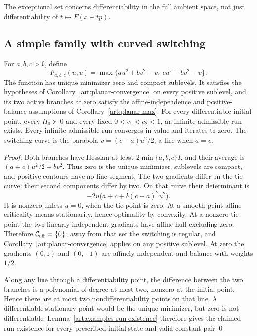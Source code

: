 The exceptional set concerns differentiability in the full ambient space,
not just differentiability of $t\mapsto F(x+tp)$.

\subsection{A simple family with curved switching}

\begin{proposition}\label{art:examples-two-quadratics}
For $a,b,c>0$, define
\[
 F_{a,b,c}(u,v)=\max\{a u^2+b v^2+v,\ c u^2+b v^2-v\}.
\]
The function has unique minimizer zero and compact sublevels. It satisfies
the hypotheses of Corollary~\ref{art:planar-convergence} on every positive
sublevel, and its two active branches at zero satisfy the affine-independence
and positive-balance assumptions of Corollary~\ref{art:planar-max}.
For every differentiable initial point, every $H_0\succ0$ and every fixed
$0<c_1<c_2<1$, an infinite admissible run exists. Every infinite admissible
run converges in value and iterates to zero. The switching curve is the
parabola $v=(c-a)u^2/2$, a line when $a=c$.
\end{proposition}
\begin{proof}
Both branches have Hessian at least $2\min\{a,b,c\}I$, and their average
is $(a+c)u^2/2+bv^2$. Thus zero is the unique minimizer, sublevels are compact,
and positive contours have no line segment. The two gradients differ on
the tie curve: their second components differ by two. On that curve their
determinant is
\[
 -2u\bigl(a+c+b(c-a)^2u^2\bigr).
\]
It is nonzero unless $u=0$, when the tie point is zero. At a smooth point
affine criticality means stationarity, hence optimality by convexity.
At a nonzero tie point the two linearly independent gradients have affine
hull excluding zero. Therefore $\mathcal C_{\rm aff}=\{0\}$; away from
that set the switching is regular, and Corollary~\ref{art:planar-convergence}
applies on any positive sublevel. At zero the gradients $(0,1)$ and $(0,-1)$
are affinely independent and balance with weights $1/2$.

Along any line through a differentiability point, the difference between
the two branches is a polynomial of degree at most two, nonzero at the
initial point. Hence there are at most two nondifferentiability points on
that line. A differentiable stationary point would be the unique minimizer,
but zero is not differentiable. Lemma~\ref{art:examples-run-existence}
therefore gives the claimed run existence for every prescribed initial
state and valid constant pair.\qed
\end{proof}

